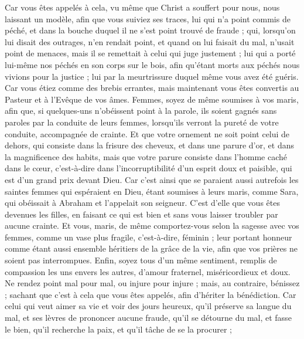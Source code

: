 \begin{multicols}{2}
Car vous êtes appelés à cela, vu même que Christ a souffert pour nous, nous laissant un modèle, afin que vous suiviez ses traces, 
lui qui n'a point commis de péché, et dans la bouche duquel il ne s'est point trouvé de fraude ;
qui, lorsqu'on lui disait des outrages, n'en rendait point, et quand on lui faisait du mal, n'usait point de menaces, mais il se remettait à celui qui juge justement ; 
lui qui a porté lui-même nos péchés en son corps sur le bois, afin qu'étant morts aux péchés nous vivions pour la justice ; lui par la meurtrissure duquel même vous avez été guéris.
Car vous étiez comme des brebis errantes, mais maintenant vous êtes convertis au Pasteur et à l'Evêque de vos âmes. 
\VerseOne{}Femmes, soyez de même soumises à vos maris, afin que, si quelques-uns n'obéissent point à la parole, ils soient gagnés sans paroles par la conduite de leurs femmes,
lorsqu'ils verront la pureté de votre conduite, accompagnée de crainte.
Et que votre ornement ne soit point celui de dehors, qui consiste dans la frisure des cheveux, et dans une parure d'or, et dans la magnificence des habits,
mais que votre parure consiste dans l’homme caché dans le cœur, c’est-à-dire dans l’incorruptibilité d’un esprit doux et paisible, qui est d’un grand prix devant Dieu.
Car c'est ainsi que se paraient aussi autrefois les saintes femmes qui espéraient en Dieu, étant soumises à leurs maris,
comme Sara, qui obéissait à Abraham et l'appelait son seigneur. C'est d'elle que vous êtes devenues les filles, en faisant ce qui est bien et sans vous laisser troubler par aucune crainte.
Et vous, maris, de même comportez-vous selon la sagesse avec vos femmes, comme un vase plus fragile, c'est-à-dire, féminin ; leur portant honneur comme étant aussi ensemble héritiers de la grâce de la vie, afin que vos prières ne soient pas interrompues. 
Enfin, soyez tous d'un même sentiment, remplis de compassion les uns envers les autres, d'amour fraternel, miséricordieux et doux.
Ne rendez point mal pour mal, ou injure pour injure ; mais, au contraire, bénissez ; sachant que c'est à cela que vous êtes appelés, afin d'hériter la bénédiction.
Car celui qui veut aimer sa vie et voir des jours heureux, qu'il préserve sa langue du mal, et ses lèvres de prononcer aucune fraude,
qu'il se détourne du mal, et fasse le bien, qu'il recherche la paix, et qu'il tâche de se la procurer ;

\end{multicols}
